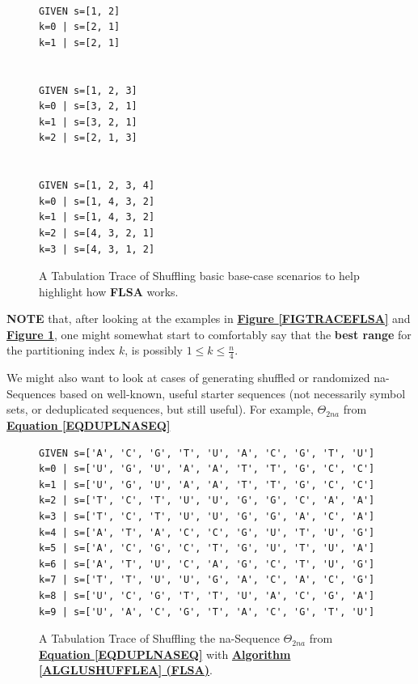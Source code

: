 \documentclass[a4paper, 18pt]{book} %
\begin{document}
\begin{figure}[H]
  \begin{center}
\LARGE
\begin{verbatim}

GIVEN s=[1, 2]
k=0 | s=[2, 1]
k=1 | s=[2, 1]


GIVEN s=[1, 2, 3]
k=0 | s=[3, 2, 1]
k=1 | s=[3, 2, 1]
k=2 | s=[2, 1, 3]


GIVEN s=[1, 2, 3, 4]
k=0 | s=[1, 4, 3, 2]
k=1 | s=[1, 4, 3, 2]
k=2 | s=[4, 3, 2, 1]
k=3 | s=[4, 3, 1, 2]
\end{verbatim}

   \caption{A Tabulation Trace of Shuffling basic base-case scenarios to help highlight how \textbf{FLSA} works.}
  \label{FIGTRACEFLSASIMPLE}
  \end{center}
\end{figure}



\textbf{NOTE} that, after looking at the examples in \textbf{\hyperref[FIGTRACEFLSA]{Figure \ref{FIGTRACEFLSA}}} and \textbf{\hyperref[FIGTRACEFLSASIMPLE]{Figure \ref{FIGTRACEFLSASIMPLE}}}, one might somewhat start to comfortably say that the \textbf{best range} for the partitioning index $k$, is possibly $1 \leq k \leq \frac{n}{4}$.

We might also want to look at cases of generating shuffled or randomized na-Sequences based on well-known, useful starter sequences (not necessarily symbol sets, or deduplicated sequences, but still useful). For example, $\Theta_{2na}$ from \textbf{\hyperref[EQDUPLNASEQ]{Equation \ref{EQDUPLNASEQ}}}

\begin{figure}[H]
  \begin{center}
\Large
\begin{verbatim}
GIVEN s=['A', 'C', 'G', 'T', 'U', 'A', 'C', 'G', 'T', 'U']
k=0 | s=['U', 'G', 'U', 'A', 'A', 'T', 'T', 'G', 'C', 'C']
k=1 | s=['U', 'G', 'U', 'A', 'A', 'T', 'T', 'G', 'C', 'C']
k=2 | s=['T', 'C', 'T', 'U', 'U', 'G', 'G', 'C', 'A', 'A']
k=3 | s=['T', 'C', 'T', 'U', 'U', 'G', 'G', 'A', 'C', 'A']
k=4 | s=['A', 'T', 'A', 'C', 'C', 'G', 'U', 'T', 'U', 'G']
k=5 | s=['A', 'C', 'G', 'C', 'T', 'G', 'U', 'T', 'U', 'A']
k=6 | s=['A', 'T', 'U', 'C', 'A', 'G', 'C', 'T', 'U', 'G']
k=7 | s=['T', 'T', 'U', 'U', 'G', 'A', 'C', 'A', 'C', 'G']
k=8 | s=['U', 'C', 'G', 'T', 'T', 'U', 'A', 'C', 'G', 'A']
k=9 | s=['U', 'A', 'C', 'G', 'T', 'A', 'C', 'G', 'T', 'U']
\end{verbatim}

   \caption{A Tabulation Trace of Shuffling the na-Sequence $\Theta_{2na}$ from \textbf{\hyperref[EQDUPLNASEQ]{Equation \ref{EQDUPLNASEQ}}} with \textbf{\hyperref[ALGLUSHUFFLEA]{Algorithm \ref{ALGLUSHUFFLEA} (FLSA)}}.}
  \label{FIGTRACEFLSA2NA}
  \end{center}
\end{figure}
\end{document}
